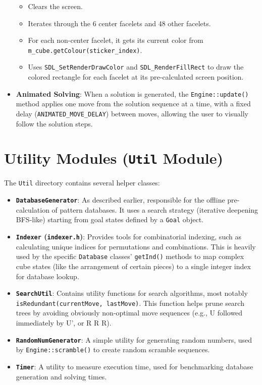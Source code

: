 \documentclass[11pt, a4paper]{article}
\begin{document}
\begin{itemize}
\begin{itemize}
            \item Clears the screen.
            \item Iterates through the 6 center facelets and 48 other facelets.
            \item For each non-center facelet, it gets its current color from \texttt{m\_cube.getColour(sticker\_index)}.
            \item Uses \texttt{SDL\_SetRenderDrawColor} and \texttt{SDL\_RenderFillRect} to draw the colored rectangle for each facelet at its pre-calculated screen position.
        \end{itemize}
    \item \textbf{Animated Solving}: When a solution is generated, the \texttt{Engine::update()} method applies one move from the solution sequence at a time, with a fixed delay (\texttt{ANIMATED\_MOVE\_DELAY}) between moves, allowing the user to visually follow the solution steps.
\end{itemize}

\section{Utility Modules (\texttt{Util} Module)}
The \texttt{Util} directory contains several helper classes:
\begin{itemize}
    \item \textbf{\texttt{DatabaseGenerator}}: As described earlier, responsible for the offline pre-calculation of pattern databases. It uses a search strategy (iterative deepening BFS-like) starting from goal states defined by a \texttt{Goal} object.
    \item \textbf{\texttt{Indexer} (\texttt{indexer.h})}: Provides tools for combinatorial indexing, such as calculating unique indices for permutations and combinations. This is heavily used by the specific \texttt{Database} classes' \texttt{getInd()} methods to map complex cube states (like the arrangement of certain pieces) to a single integer index for database lookup.
    \item \textbf{\texttt{SearchUtil}}: Contains utility functions for search algorithms, most notably \texttt{isRedundant(currentMove, lastMove)}. This function helps prune search trees by avoiding obviously non-optimal move sequences (e.g., U followed immediately by U', or R R R).
    \item \textbf{\texttt{RandomNumGenerator}}: A simple utility for generating random numbers, used by \texttt{Engine::scramble()} to create random scramble sequences.
    \item \textbf{\texttt{Timer}}: A utility to measure execution time, used for benchmarking database generation and solving times.
\end{itemize}
\end{document}
